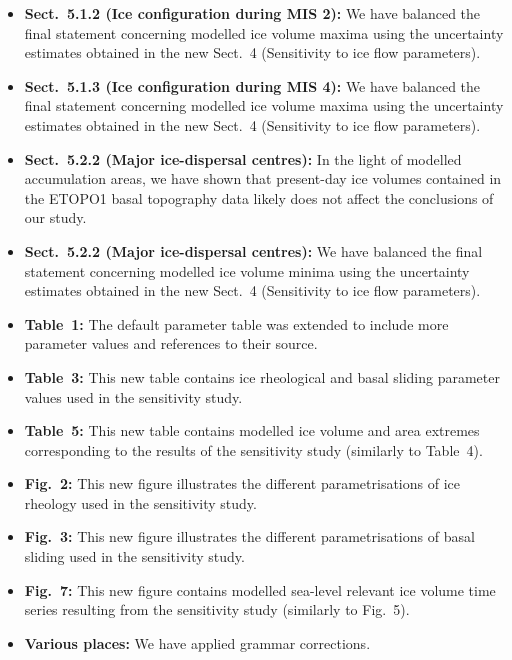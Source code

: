 \begin{itemize}
    \item \textbf{Sect.~5.1.2 (Ice configuration during MIS 2):}
    We have balanced the final statement concerning modelled ice volume maxima
    using the uncertainty estimates obtained in the new Sect.~4 (Sensitivity to
    ice flow parameters).

    \item \textbf{Sect.~5.1.3 (Ice configuration during MIS 4):}
    We have balanced the final statement concerning modelled ice volume maxima
    using the uncertainty estimates obtained in the new Sect.~4 (Sensitivity to
    ice flow parameters).

    \item \textbf{Sect.~5.2.2 (Major ice-dispersal centres):}
    In the light of modelled accumulation areas, we have shown that present-day
    ice volumes contained in the ETOPO1 basal topography data likely does not
    affect the conclusions of our study.

    \item \textbf{Sect.~5.2.2 (Major ice-dispersal centres):}
    We have balanced the final statement concerning modelled ice volume minima
    using the uncertainty estimates obtained in the new Sect.~4 (Sensitivity to
    ice flow parameters).

    \item \textbf{Table~1:}
    The default parameter table was extended to include more parameter values
    and references to their source.

    \item \textbf{Table~3:}
    This new table contains ice rheological and basal sliding parameter values
    used in the sensitivity study.

    \item \textbf{Table~5:}
    This new table contains modelled ice volume and area extremes corresponding
    to the results of the sensitivity study (similarly to Table~4).

    \item \textbf{Fig.~2:}
    This new figure illustrates the different parametrisations of ice rheology
    used in the sensitivity study.

    \item \textbf{Fig.~3:}
    This new figure illustrates the different parametrisations of basal sliding
    used in the sensitivity study.

    \item \textbf{Fig.~7:}
    This new figure contains modelled sea-level relevant ice volume time series
    resulting from the sensitivity study (similarly to Fig.~5).

    \item \textbf{Various places:}
    We have applied grammar corrections.

\end{itemize}

